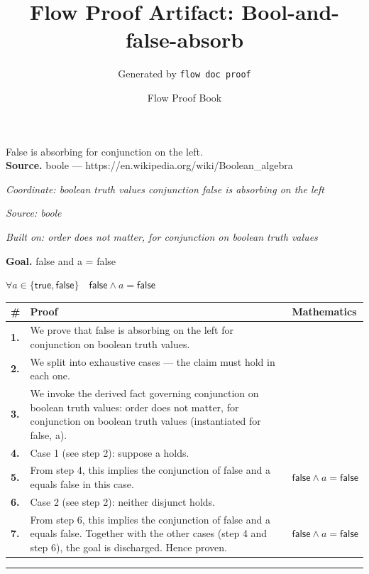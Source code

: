 \documentclass[11pt]{article}
\title{Flow Proof Artifact: Bool-and-false-absorb}
\author{Generated by \texttt{flow doc proof}}
\date{Flow Proof Book}
\theoremstyle{definition}
\begin{document}
\maketitle
False is absorbing for conjunction on the left.\\[0.5em]
\textbf{Source.} boole — https://en.wikipedia.org/wiki/Boolean\_algebra\\[0.5em]
\bigskip
{}\par
\smallskip\noindent\textit{Coordinate: boolean truth values \cdot conjunction \cdot false is absorbing on the left}\par
\smallskip\noindent\textit{Source: boole}\par
\smallskip\noindent\textit{Built on: order does not matter, for conjunction on boolean truth values}\par
\medskip
\noindent\textbf{Goal.} false and a = false\par
\noindent$\displaystyle \forall a \in \{\mathsf{true}, \mathsf{false}\}\quad \mathsf{false} \land a = \mathsf{false}$\par
\medskip
\noindent
\begin{tabular}{@{} >{\raggedright\arraybackslash}p{} >{\raggedright\arraybackslash}p{} >{\raggedleft\arraybackslash}p{} @{}}
\textbf{\#} & \textbf{Proof} & \textbf{Mathematics} \\
\midrule
\textbf{1.} & We prove that false is absorbing on the left for conjunction on boolean truth values. & \\[0.45em]
\textbf{2.} & We split into exhaustive cases — the claim must hold in each one. & \\[0.45em]
\textbf{3.} & We invoke the derived fact governing conjunction on boolean truth values: order does not matter, for conjunction on boolean truth values (instantiated for false, a). & \\[0.45em]
\textbf{4.} & Case 1 (see step 2): suppose a holds. & \\[0.45em]
\textbf{5.} & From step 4, this implies the conjunction of false and a equals false in this case. & $\displaystyle \mathsf{false} \land a = \mathsf{false}$ \\[0.45em]
\textbf{6.} & Case 2 (see step 2): neither disjunct holds. & \\[0.45em]
\textbf{7.} & From step 6, this implies the conjunction of false and a equals false. Together with the other cases (step 4 and step 6), the goal is discharged. Hence proven. & $\displaystyle \mathsf{false} \land a = \mathsf{false}$ \\[0.45em]
\bottomrule
\end{tabular}
\label{thm:Bool-conjunction-false_is_absorbing_on_the_left}
\par\medskip\hrule
\end{document}
